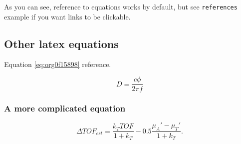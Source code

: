 As you can see, reference to equations works by default, but see \texttt{references}
example if you want links to be clickable.

\subsection{Other latex equations}
\label{sec:orgbc22a42}
Equation \ref{eq:org0f15898} reference.

\begin{equation}
\label{eq:org0f15898}
D = \frac{c\phi}{2\pi f}
\end{equation}

\subsubsection{A more complicated equation}
\label{sec:orgde8c4f0}

\begin{equation}
\Delta TOF_{est} = \frac{k_T TOF}{1+k_T } - 0.5 \frac{\mu_A' - \mu_T'}{1+k_T}.
\end{equation}


